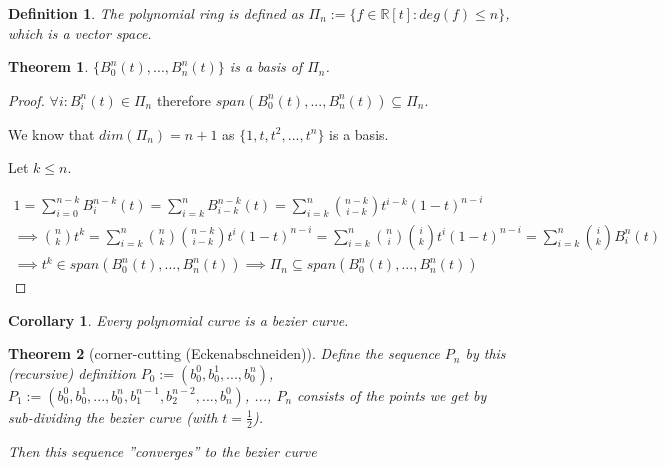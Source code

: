 \documentclass[]{article}
\newtheorem{theorem}{Theorem}
\newtheorem{definition}{Definition}
\newtheorem{corollary}{Corollary}
\begin{document}
\begin{definition}
	The polynomial ring is defined as $\Pi_n := \{f \in \mathbb{R}[t] : deg(f) \leq n\}$, which is a vector space.
\end{definition}

\begin{theorem}
	$\{B_0^n(t), ..., B_n^n(t)\}$ is a basis of $\Pi_n$.
\end{theorem}

\begin{proof}
	$\forall i: B_i^n(t) \in \Pi_n$ therefore $span(B_0^n(t), ..., B_n^n(t)) \subseteq \Pi_n$.
	
	We know that $dim(\Pi_n) = n+1$ as $\{1, t, t^2, ..., t^n\}$ is a basis.
	
	Let $k \leq n$.
	
	\begin{align*}
		1 = \sum_{i=0}^{n-k} B_i^{n-k}(t) = \sum_{i=k}^{n} B_{i-k}^{n-k}(t) = \sum_{i=k}^{n} \binom{n-k}{i-k} t^{i-k} (1-t)^{n-i}\\
		\implies \binom{n}{k} t^k = \sum_{i=k}^{n} \binom{n}{k} \binom{n-k}{i-k} t^i (1-t)^{n-i} = \sum_{i=k}^{n} \binom{n}{i} \binom{i}{k} t^i (1-t)^{n-i} = \sum_{i=k}^{n} \binom{i}{k} B_i^n(t)\\
		\implies t^k \in span(B_0^n(t), ..., B_n^n(t)) \implies \Pi_n \subseteq span(B_0^n(t), ..., B_n^n(t))
	\end{align*}
\end{proof}

\begin{corollary}
	Every polynomial curve is a bezier curve.
\end{corollary}

\begin{theorem}[corner-cutting (Eckenabschneiden)]
	Define the sequence $P_n$ by this (recursive) definition $P_0 := (b_0^0, b_0^1, ..., b_0^n)$, $P_1 := (b_0^0, b_0^1, ..., b_0^n, b_1^{n-1}, b_2^{n-2}, ..., b_n^0)$, ..., $P_n$ consists of the points we get by sub-dividing the bezier curve (with $t=\frac{1}{2}$).
	
	Then this sequence ''converges'' to the bezier curve
\end{theorem}
\end{document}

